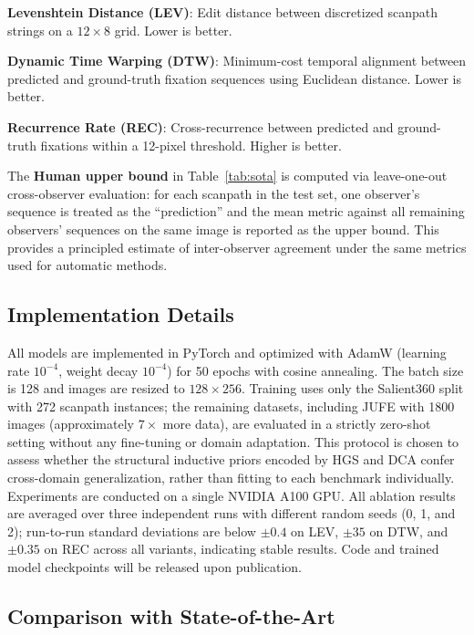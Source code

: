 \documentclass[sigconf]{acmart}
\begin{document}
\textbf{Levenshtein Distance (LEV)}: Edit distance between discretized scanpath strings on a $12 \times 8$ grid. Lower is better.

\textbf{Dynamic Time Warping (DTW)}: Minimum-cost temporal alignment between predicted and ground-truth fixation sequences using Euclidean distance. Lower is better.

\textbf{Recurrence Rate (REC)}: Cross-recurrence between predicted and ground-truth fixations within a 12-pixel threshold. Higher is better.

The \textbf{Human upper bound} in Table~\ref{tab:sota} is computed via leave-one-out cross-observer evaluation: for each scanpath in the test set, one observer's sequence is treated as the ``prediction'' and the mean metric against all remaining observers' sequences on the same image is reported as the upper bound. This provides a principled estimate of inter-observer agreement under the same metrics used for automatic methods.

\subsection{Implementation Details}
All models are implemented in PyTorch and optimized with AdamW (learning rate $10^{-4}$, weight decay $10^{-4}$) for 50 epochs with cosine annealing. The batch size is 128 and images are resized to $128 \times 256$. Training uses only the Salient360 split with 272 scanpath instances; the remaining datasets, including JUFE with 1800 images (approximately $7\times$ more data), are evaluated in a strictly zero-shot setting without any fine-tuning or domain adaptation. This protocol is chosen to assess whether the structural inductive priors encoded by HGS and DCA confer cross-domain generalization, rather than fitting to each benchmark individually. Experiments are conducted on a single NVIDIA A100 GPU. All ablation results are averaged over three independent runs with different random seeds (0, 1, and 2); run-to-run standard deviations are below $\pm 0.4$ on LEV, $\pm 35$ on DTW, and $\pm 0.35$ on REC across all variants, indicating stable results. Code and trained model checkpoints will be released upon publication.

\subsection{Comparison with State-of-the-Art}
\label{sec:sota}
\end{document}
